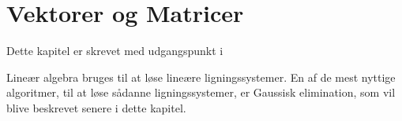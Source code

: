 \chapter{Vektorer og Matricer}
Dette kapitel er skrevet med udgangspunkt i \citep{lial}

Lineær algebra bruges til at løse lineære ligningssystemer. 
En af de mest nyttige algoritmer, til at løse sådanne ligningssystemer, er Gaussisk elimination, som vil blive beskrevet senere i dette kapitel.


